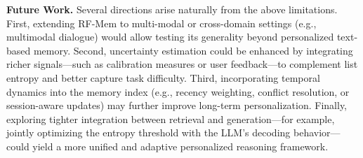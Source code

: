 \textbf{Future Work.} 
Several directions arise naturally from the above limitations. 
First, extending RF-Mem to multi-modal or cross-domain settings (e.g., multimodal dialogue) would allow testing its generality beyond personalized text-based memory. 
Second, uncertainty estimation could be enhanced by integrating richer signals—such as calibration measures or user feedback—to complement list entropy and better capture task difficulty. 
Third, incorporating temporal dynamics into the memory index (e.g., recency weighting, conflict resolution, or session-aware updates) may further improve long-term personalization. 
Finally, exploring tighter integration between retrieval and generation—for example, jointly optimizing the entropy threshold with the LLM’s decoding behavior—could yield a more unified and adaptive personalized reasoning framework.





